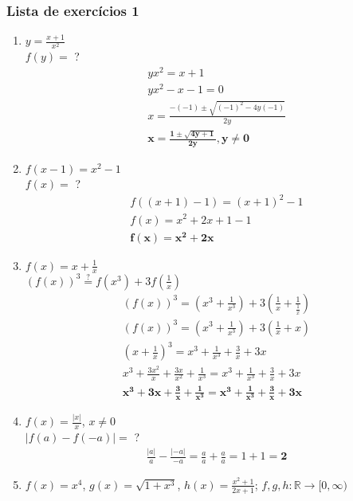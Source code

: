 \documentclass{article}
\begin{document}
\subsubsection*{Lista de exercícios 1}
\begin{enumerate}\bfseries
    \item $y = \frac{x+1}{x^2}$ \\
    $f(y)=$ ?
        \begin{gather*}
            yx^2 = x + 1 \\
            yx^2 - x - 1 = 0 \\
            x = \frac{-(-1) \pm \sqrt{(-1)^2 - 4y(-1)}}{2y} \\
            \mathbf{x = \frac{1 \pm \sqrt{4y + 1}}{2y}, y \neq 0}
        \end{gather*}
    \item $f(x-1) = x^2 - 1$ \\
    $f(x)=$ ?
        \begin{gather*}
            f((x + 1) - 1) = (x + 1)^2 - 1 \\
            f(x) = x^2 + 2x + 1 - 1 \\
            \mathbf{f(x) = x^2 + 2x}
        \end{gather*}
    \item $f(x) = x + \frac{1}{x}$ \\
    $(f(x))^3 \stackrel{?}{=} f(x^3) + 3f(\frac{1}{x})$
        \begin{gather*}
            (f(x))^3 = (x^3 + \frac{1}{x^3}) + 3({\frac{1}{x}} + \frac{1}{\frac{1}{x}}) \\
            (f(x))^3 = (x^3 + \frac{1}{x^3}) + 3(\frac{1}{x} + x) \\
            (x + \frac{1}{x})^3 = x^3 + \frac{1}{x^3} + {\frac{3}{x} + 3x} \\
            x^3 + \frac{3x^2}{x} + \frac{3x}{x^2} + \frac{1}{x^3} = x^3 + \frac{1}{x^3} + {\frac{3}{x} + 3x} \\
           \mathbf{x^3 + 3x + \frac{3}{x} + \frac{1}{x^3} = x^3 + \frac{1}{x^3} + {\frac{3}{x}} + 3x}
        \end{gather*}
    \item $f(x) = \frac{|x|}{x}$, $x \neq 0$ \\
    $|f(a) - f(-a)| =$ ?
        \begin{gather*}
            \frac{|a|}{a} - \frac{|-a|}{-a} =
            \frac{a}{a} + \frac{a}{a} = 1 + 1 = \mathbf{2}
        \end{gather*}
    \item $f(x) = x^4$, $g(x) = \sqrt{1+x^3}$, $h(x) = \frac{x^2 + 1}{2x + 1}$; $f,g,h : \mathbb{R} \rightarrow [0, \infty)$

\end{enumerate}
\end{document}
